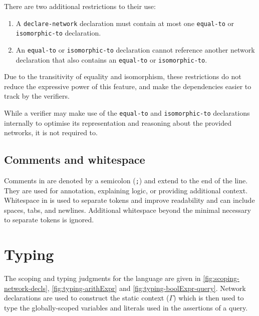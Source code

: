 There are two additional restrictions to their use:
\begin{enumerate}
\item A \texttt{declare-network} declaration must contain at most one \texttt{equal-to} or \texttt{isomorphic-to} declaration.
\item An \texttt{equal-to} or \texttt{isomorphic-to} declaration cannot reference another network declaration that also contains an \texttt{equal-to} or \texttt{isomorphic-to}. 
\end{enumerate}
Due to the transitivity of equality and isomorphism, these restrictions do not reduce the expressive power of this feature, and make the dependencies easier to track by the verifiers.

While a verifier may make use of the \texttt{equal-to} and \texttt{isomorphic-to} declarations internally to optimise its representation and reasoning about the provided networks, it is not required to.



\subsection{Comments and whitespace}

Comments in \vnnlib{} are denoted by a semicolon (\texttt{;}) and extend to the end of the line. They are used for annotation, explaining logic, or providing additional context. Whitespace in \vnnlib{} is used to separate tokens and improve readability and can include spaces, tabs, and newlines. Additional whitespace beyond the minimal necessary to separate tokens is ignored.


\section{Typing}
\label{sec:scoping_and_typing}
The scoping and typing judgments for the language are given in \autoref{fig:scoping-network-decls}, \autoref{fig:typing-arithExpr} and \autoref{fig:typing-boolExpr-query}. 
Network declarations are used to construct the static context ($\Gamma$) which is then used to type the globally-scoped variables and literals used in the assertions of a query.


